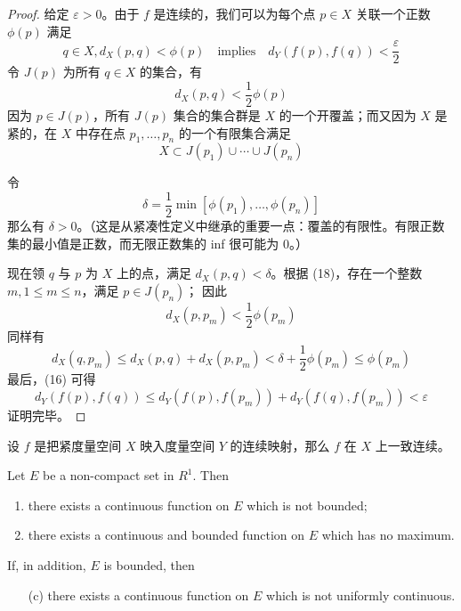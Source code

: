 \documentclass[../poma-notes.tex]{subfiles}
\begin{document}
\begin{proof}
  给定 $\varepsilon > 0$。由于 $f$ 是连续的，我们可以为每个点 $p \in X$ 关联一个正数 $\phi(p)$ 满足
  \begin{equation}
    q \in X, d_X(p,q) < \phi(p) \quad \text{implies} \quad d_Y(f(p),f(q)) < \frac{\varepsilon}{2}
  \end{equation}
  令 $J(p)$ 为所有 $q \in X$ 的集合，有
  \begin{equation}
    d_X(p,q) < \frac{1}{2} \phi(p)
  \end{equation}
  因为 $p \in J(p)$，所有 $J(p)$ 集合的集合群是 $X$ 的一个开覆盖；而又因为 $X$ 是紧的，在 $X$ 中存在点 $p_1, \dots, p_n$
  的一个有限集合满足
  \begin{equation}
    X \subset J(p_1) \cup \cdots \cup J(p_n)
  \end{equation}

  令
  \begin{equation}
    \delta = \frac{1}{2} \min [\phi(p_1),\dots,\phi(p_n)]
  \end{equation}
  那么有 $\delta > 0$。（这是从紧凑性定义中继承的重要一点：覆盖的有限性。有限正数集的最小值是正数，而无限正数集的 inf 很可能为 0。）

  现在领 $q$ 与 $p$ 为 $X$ 上的点，满足 $d_X(p,q)<\delta$。根据 (18)，存在一个整数 $m, 1 \le m \le n$，满足 $p \in J(p_n)$；
  因此
  \begin{equation}
    d_X(p, p_m) < \frac{1}{2} \phi(p_m)
  \end{equation}
  同样有
  \[
    d_X(q, p_m) \le d_X(p,q) + d_X(p,p_m) < \delta + \frac{1}{2} \phi(p_m) \le \phi(p_m)
  \]
  最后，(16) 可得
  \[
    d_Y(f(p),f(q)) \le d_Y(f(p),f(p_m)) + d_Y(f(q),f(p_m)) < \varepsilon
  \]
  证明完毕。
\end{proof}

\begin{anote}
  设 $f$ 是把紧度量空间 $X$ 映入度量空间 $Y$ 的连续映射，那么 $f$ 在 $X$ 上一致连续。
\end{anote}

\begin{theorem}
  Let $E$ be a non-compact set in $R^1$. Then
  \begin{enumerate}[label=(\alph*)]
    \item there exists a continuous function on $E$ which is not bounded;
    \item there exists a continuous and bounded function on $E$ which has no maximum.
  \end{enumerate}

  If, in addition, $E$ is bounded, then
  \begin{enumerate}
    \item [(c)] there exists a continuous function on $E$ which is not uniformly continuous.
  \end{enumerate}
\end{theorem}

\end{document}
